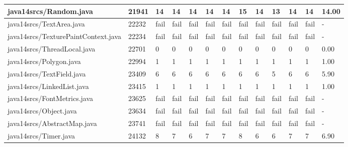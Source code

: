 \begin{tabular}{|l|l|l|l|l|l|l|l|l|l|l|l|l|}
\hline
java14srcs/Random.java                             & 21941       & 14        & 14        & 14        & 14        & 14        & 15        & 14        & 13        & 14        & 14        & 14.00     \\
\hline
java14srcs/TextArea.java                           & 22232       & fail      & fail      & fail      & fail      & fail      & fail      & fail      & fail      & fail      & fail      & -         \\
\hline
java14srcs/TexturePaintContext.java                & 22234       & fail      & fail      & fail      & fail      & fail      & fail      & fail      & fail      & fail      & fail      & -         \\
\hline
java14srcs/ThreadLocal.java                        & 22701       & 0         & 0         & 0         & 0         & 0         & 0         & 0         & 0         & 0         & 0         & 0.00      \\
\hline
java14srcs/Polygon.java                            & 22994       & 1         & 1         & 1         & 1         & 1         & 1         & 1         & 1         & 1         & 1         & 1.00      \\
\hline
java14srcs/TextField.java                          & 23409       & 6         & 6         & 6         & 6         & 6         & 6         & 6         & 5         & 6         & 6         & 5.90      \\
\hline
java14srcs/LinkedList.java                         & 23415       & 1         & 1         & 1         & 1         & 1         & 1         & 1         & 1         & 1         & 1         & 1.00      \\
\hline
java14srcs/FontMetrics.java                        & 23625       & fail      & fail      & fail      & fail      & fail      & fail      & fail      & fail      & fail      & fail      & -         \\
\hline
java14srcs/Object.java                             & 23634       & fail      & fail      & fail      & fail      & fail      & fail      & fail      & fail      & fail      & fail      & -         \\
\hline
java14srcs/AbstractMap.java                        & 23741       & fail      & fail      & fail      & fail      & fail      & fail      & fail      & fail      & fail      & fail      & -         \\
\hline
java14srcs/Timer.java                              & 24132       & 8         & 7         & 6         & 7         & 7         & 8         & 6         & 6         & 7         & 7         & 6.90      \\

\end{tabular}
